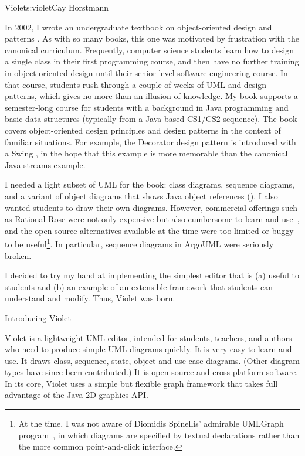 \begin{aosachapter}{Violet}{s:violet}{Cay Horstmann}

In 2002, I wrote an undergraduate textbook on object-oriented design
and patterns \cite{bib:horstmann:oodp}.  As with so many books, this one
was motivated by frustration with the canonical curriculum.
Frequently, computer science students learn how to design a single
class in their first programming course, and then have no further
training in object-oriented design until their senior level software
engineering course. In that course, students rush through a couple of
weeks of UML and design patterns, which gives no more than an illusion
of knowledge. My book supports a semester-long course for students
with a background in Java programming and basic data structures
(typically from a Java-based CS1/CS2 sequence). The book covers object-oriented
design principles and design patterns in the context of familiar
situations. For example, the Decorator design pattern is introduced
with a Swing , in the hope that this example is more
memorable than the canonical Java streams example.


I needed a light subset of UML for the book: class diagrams, sequence
diagrams, and a variant of object diagrams that shows Java object
references ().  I also wanted students to
draw their own diagrams. However, commercial offerings such as
Rational Rose were not only expensive but also cumbersome to learn and
use~\cite{bib:shumba:ratrose}, and the open source alternatives
available at the time were too limited or buggy to be
useful\footnote{At the time, I was not aware of Diomidis Spinellis'
admirable UMLGraph program~\cite{bib:spinellis:umlgraph}, in which
diagrams are specified by textual declarations rather than the more
common point-and-click interface.}.  In particular, sequence
diagrams in ArgoUML were seriously broken.

I decided to try my hand at implementing the simplest editor that is
(a) useful to students and (b) an example of an extensible framework
that students can understand and modify. Thus, Violet was born.

\begin{aosasect1}{Introducing Violet}

Violet is a lightweight UML editor, intended for students, teachers,
and authors who need to produce simple UML diagrams quickly. It is
very easy to learn and use. It draws class, sequence, state, object
and use-case diagrams. (Other diagram types have since been
contributed.) It is open-source and cross-platform software. In its
core, Violet uses a simple but flexible graph framework that takes
full advantage of the Java 2D graphics API.


\end{aosasect1}
\end{aosachapter}
